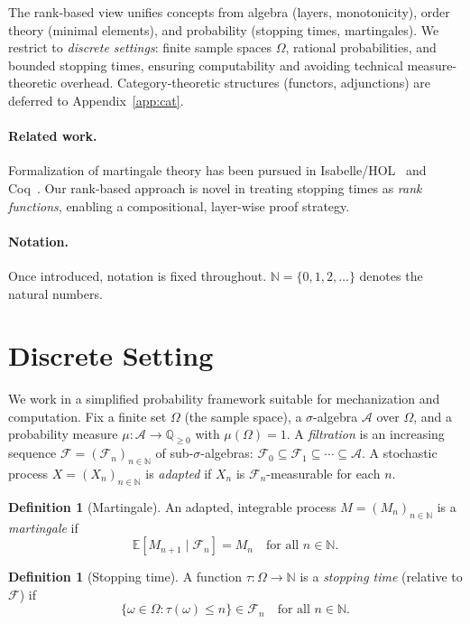 \documentclass[11pt]{article}
\theoremstyle{definition}
\newtheorem{definition}[theorem]{Definition}
\theoremstyle{remark}
\newcommand{\Filtration}{\mathcal{F}}
\newcommand{\NN}{\mathbb{N}}
\newcommand{\QQ}{\mathbb{Q}}
\newcommand{\EE}{\mathbb{E}}
\begin{document}
The rank-based view unifies concepts from algebra (layers, monotonicity), order theory (minimal elements), and probability (stopping times, martingales).
We restrict to \emph{discrete settings}: finite sample spaces $\Omega$, rational probabilities, and bounded stopping times, ensuring computability and avoiding technical measure-theoretic overhead.
Category-theoretic structures (functors, adjunctions) are deferred to Appendix~\ref{app:cat}.

\paragraph{Related work.}
Formalization of martingale theory has been pursued in Isabelle/HOL~\cite{isabelle-ost} and Coq~\cite{coq-prob}.
Our rank-based approach is novel in treating stopping times as \emph{rank functions}, enabling a compositional, layer-wise proof strategy.

\paragraph{Notation.}
Once introduced, notation is fixed throughout.
$\NN = \{0,1,2,\ldots\}$ denotes the natural numbers.

\section{Discrete Setting}
\label{sec:discrete}

We work in a simplified probability framework suitable for mechanization and computation.
Fix a finite set $\Omega$ (the sample space), a $\sigma$-algebra $\mathcal{A}$ over $\Omega$, and a probability measure $\mu: \mathcal{A} \to \QQ_{\geq 0}$ with $\mu(\Omega) = 1$.
A \emph{filtration} is an increasing sequence $\Filtration = (\Filtration_n)_{n \in \NN}$ of sub-$\sigma$-algebras: $\Filtration_0 \subseteq \Filtration_1 \subseteq \cdots \subseteq \mathcal{A}$.
A stochastic process $X = (X_n)_{n \in \NN}$ is \emph{adapted} if $X_n$ is $\Filtration_n$-measurable for each $n$.

\begin{definition}[Martingale]
\label{def:martingale}
An adapted, integrable process $M = (M_n)_{n \in \NN}$ is a \emph{martingale} if
\[
\EE[M_{n+1} \mid \Filtration_n] = M_n \quad \text{for all } n \in \NN.
\]
\end{definition}

\begin{definition}[Stopping time]
\label{def:stopping-time}
A function $\tau: \Omega \to \NN$ is a \emph{stopping time} (relative to $\Filtration$) if
\[
\{\omega \in \Omega : \tau(\omega) \leq n\} \in \Filtration_n \quad \text{for all } n \in \NN.
\]
\end{definition}
\end{document}

